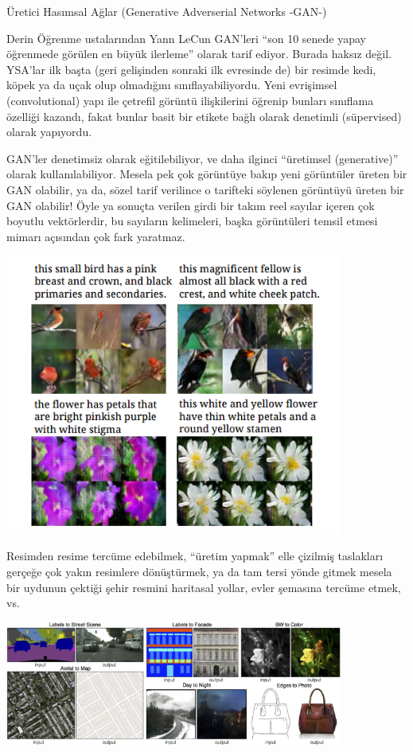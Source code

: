 \documentclass[12pt,fleqn]{article}\usepackage{../../common}
\begin{document}
Üretici Hasımsal Ağlar (Generative Adverserial Networks -GAN-)

Derin Öğrenme ustalarından Yann LeCun GAN'leri ``son 10 senede yapay öğrenmede
görülen en büyük ilerleme'' olarak tarif ediyor. Burada haksız değil. YSA'lar
ilk başta (geri gelişinden sonraki ilk evresinde de) bir resimde kedi, köpek ya
da uçak olup olmadığını sınıflayabiliyordu. Yeni evrişimsel (convolutional) yapı
ile çetrefil görüntü ilişkilerini öğrenip bunları sınıflama özelliği kazandı,
fakat bunlar basit bir etikete bağlı olarak denetimli (süpervised) olarak
yapıyordu.

GAN'ler denetimsiz olarak eğitilebiliyor, ve daha ilginci ``üretimsel
(generative)'' olarak kullanılabiliyor. Mesela pek çok görüntüye bakıp yeni
görüntüler üreten bir GAN olabilir, ya da, sözel tarif verilince o tarifteki
söylenen görüntüyü üreten bir GAN olabilir! Öyle ya sonuçta verilen girdi bir
takım reel sayılar içeren çok boyutlu vektörlerdir, bu sayıların kelimeleri,
başka görüntüleri temsil etmesi mimarı açısından çok fark yaratmaz.

\includegraphics[width=30em]{gan_02.png}

Resimden resime tercüme edebilmek, ``üretim yapmak'' elle çizilmiş taslakları
gerçeğe çok yakın resimlere dönüştürmek, ya da tam tersi yönde gitmek mesela
bir uydunun çektiği şehir resmini haritasal yollar, evler şemasına tercüme
etmek, vs.

\includegraphics[width=30em]{gan_04.png}
\end{document}
